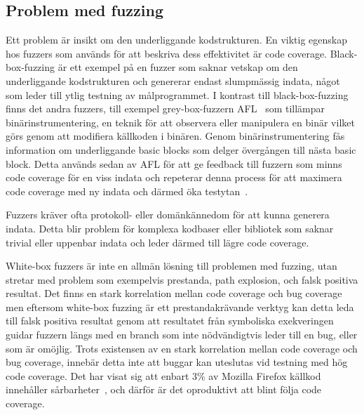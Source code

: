 \subsection{Problem med fuzzing} Ett problem är insikt om den underliggande
kodstrukturen. En viktig egenskap hos fuzzers som används för att beskriva dess
effektivitet är code coverage. Black-box-fuzzing är ett exempel på en fuzzer som
saknar vetskap om den underliggande kodstrukturen och genererar endast
slumpmässig indata, något som leder till ytlig testning av målprogrammet. I
kontrast till black-box-fuzzing finns det andra fuzzers, till exempel
grey-box-fuzzern AFL~\cite{aflplusplus} som tillämpar binärinstrumentering, en
teknik för att observera eller manipulera en binär vilket görs genom att
modifiera källkoden i binären. Genom binärinstrumentering fås information om
underliggande basic blocks som delger övergången till nästa basic block. Detta
används sedan av AFL för att ge feedback till fuzzern som minns code coverage
för en viss indata och repeterar denna process för att maximera code coverage
med ny indata och därmed öka testytan~\cite{challenges_fuzzing}.

Fuzzers kräver ofta protokoll- eller domänkännedom för att kunna generera
indata. Detta blir problem för komplexa kodbaser eller bibliotek som saknar
trivial eller uppenbar indata och leder därmed till lägre code coverage. 

White-box fuzzers är inte en allmän lösning till problemen med fuzzing, utan
stretar med problem som exempelvis prestanda, path explosion, och falsk positiva
resultat. Det finns en stark korrelation mellan code coverage och bug
coverage~\cite{directed_greybox_fuzzing} men eftersom white-box fuzzing är ett
prestandakrävande verktyg kan detta leda till falsk positiva resultat genom att
resultatet från symboliska exekveringen guidar fuzzern längs med en branch som
inte nödvändigtvis leder till en bug, eller som är omöjlig. Trots existensen av
en stark korrelation mellan code coverage och bug coverage, innebär detta inte
att buggar kan uteslutas vid testning med hög code coverage. Det har visat sig
att enbart 3\% av Mozilla Firefox källkod innehåller
sårbarheter~\cite{fault_prediction_vuln_pred}, och därför är det oproduktivt att
blint följa code coverage.
